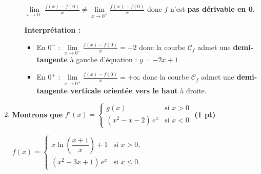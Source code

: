 \documentclass[12pt,a4paper]{article}
\begin{document}
\begin{enumerate}
\begin{enumerate}
                    \(  \lim\limits_{x \to 0^-} \frac{f(x) - f(0)}{x} \neq \lim\limits_{x \to 0^+} \frac{f(x) - f(0)}{x}\) donc \( f \) n’est \textbf{pas dérivable en 0}.

                    \textbf{Interprétation :}

                    \begin{itemize}
                        \item En \( 0^- \) : \( \displaystyle \lim\limits_{x \to 0^-} \frac{f(x) - f(0)}{x} = -2 \)
                              donc la courbe \( \mathcal{C}_f \) admet une \textbf{demi-tangente} à gauche d'équation : \( y = -2x + 1 \)

                        \item En \( 0^+ \) : \( \displaystyle \lim\limits_{x \to 0^+} \frac{f(x) - f(0)}{x} = +\infty \)
                              donc la courbe \( \mathcal{C}_f \) admet une \textbf{demi-tangente verticale orientée vers le haut} à droite.
                    \end{itemize}
          \end{enumerate}
    \item \textbf{Montrons que }
          \(
          f'(x) =
          \begin{cases}
              g(x)                & \text{si } x > 0 \\
              (x^2 - x - 2)\, e^x & \text{si } x < 0
          \end{cases}
          \) \hfill \textbf{(1 pt)}

          \(
          f(x) =
          \begin{cases}
              x \ln\left( \dfrac{x+1}{x} \right) + 1 & \text{si } x > 0,    \\
              (x^2 - 3x + 1)\, e^x                   & \text{si } x \leq 0.
          \end{cases}
          \)


\end{enumerate}
\end{document}
